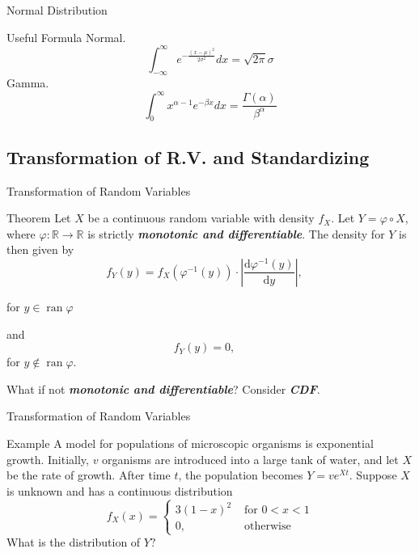 \documentclass{beamer}
\newcommand{\bb}[1]{\textcolor{antiquefuchsia}{\textbf{\textit{#1}}}}
\begin{document}
\begin{frame}{Normal Distribution}
\begin{block}{Useful Formula}
Normal.
$$
\int_{-\infty}^{\infty} e^{-\frac{(x-\mu)^{2}}{2 \sigma^{2}}} d x=\sqrt{2 \pi} \sigma
$$
Gamma.
$$
\int_{0}^{\infty} x^{\alpha-1} e^{-\beta x} d x=\frac{\Gamma(\alpha)}{\beta^{\alpha}}
$$
\end{block}
\end{frame}

\subsection{Transformation of R.V. and Standardizing}
\begin{frame}{Transformation of Random Variables}
\begin{block}{Theorem}
Let $X$ be a continuous random variable with density $f_{X}$. Let $Y=\varphi \circ X$, where $\varphi: \mathbb{R} \rightarrow \mathbb{R}$ is strictly \bb{monotonic and differentiable}. The density for $Y$ is then given by
$$f_{Y}(y)=f_{X}\left(\varphi^{-1}(y)\right) \cdot\left|\frac{\mathrm{d} \varphi^{-1}(y)}{\mathrm{d} y}\right|, \quad$$

for $y \in \operatorname{ran} \varphi$


and $$f_{Y}(y)=0, \quad$$ for $y \notin \operatorname{ran} \varphi .$
\end{block}
What if not \bb{monotonic and differentiable}? Consider \bb{CDF}.
\end{frame}

\begin{frame}{Transformation of Random Variables}
\begin{block}{Example}
A model for populations of microscopic organisms is exponential growth. Initially, $v$ organisms are introduced into a large tank of water, and let $X$ be the rate of growth. After time $t$, the population becomes $Y=v e^{X t}$. Suppose $X$ is unknown and has a continuous distribution
$$
f_{X}(x)= \begin{cases}3(1-x)^{2} & \text { for } 0<x<1 \\ 0, & \text { otherwise }\end{cases}
$$
What is the distribution of $Y ?$
\end{block}
\end{frame}
\end{document}

